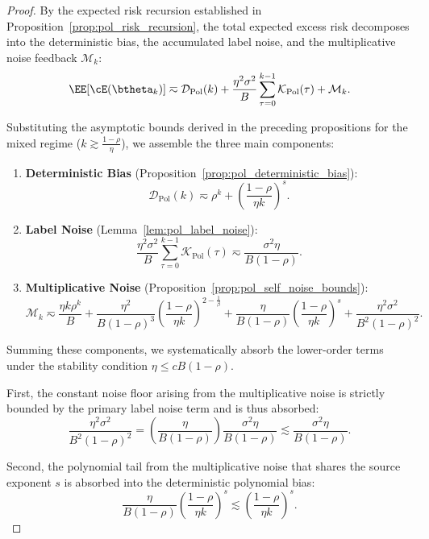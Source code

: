 \begin{proof}
By the expected risk recursion established in Proposition~\ref{prop:pol_risk_recursion}, the total expected excess risk decomposes into the deterministic bias, the accumulated label noise, and the multiplicative noise feedback $\mathcal{M}_k$:
\[
    \EE[\cE(\btheta_k)]
    \eqsim
    \mathcal{D}_{\mathrm{Pol}}(k)
    +
    \frac{\eta^2\sigma^2}{B}\sum_{\tau=0}^{k-1}\mathcal{K}_{\mathrm{Pol}}(\tau)
    +
    \mathcal M_k.
\]

Substituting the asymptotic bounds derived in the preceding propositions for the mixed regime ($k \gtrsim \frac{1-\rho}{\eta}$), we assemble the three main components:
\begin{enumerate}
    \item \textbf{Deterministic Bias} (Proposition~\ref{prop:pol_deterministic_bias}):
    \[
        \mathcal{D}_{\mathrm{Pol}}(k) \eqsim \rho^k + \left(\frac{1-\rho}{\eta k}\right)^s.
    \]
    \item \textbf{Label Noise} (Lemma~\ref{lem:pol_label_noise}):
    \[
        \frac{\eta^2\sigma^2}{B}\sum_{\tau=0}^{k-1}\mathcal{K}_{\mathrm{Pol}}(\tau) \eqsim \frac{\sigma^2\eta}{B(1-\rho)}.
    \]
    \item \textbf{Multiplicative Noise} (Proposition~\ref{prop:pol_self_noise_bounds}):
    \[
        \mathcal M_k \eqsim \frac{\eta k\rho^k}{B} + \frac{\eta^2}{B(1-\rho)^3} \left(\frac{1-\rho}{\eta k}\right)^{2-\frac{1}{\beta}} + \frac{\eta}{B(1-\rho)} \left(\frac{1-\rho}{\eta k}\right)^s + \frac{\eta^2\sigma^2}{B^2(1-\rho)^2}.
    \]
\end{enumerate}

Summing these components, we systematically absorb the lower-order terms under the stability condition $\eta \le cB(1-\rho)$. 

First, the constant noise floor arising from the multiplicative noise is strictly bounded by the primary label noise term and is thus absorbed:
\[
    \frac{\eta^2\sigma^2}{B^2(1-\rho)^2} = \left(\frac{\eta}{B(1-\rho)}\right) \frac{\sigma^2\eta}{B(1-\rho)} \lesssim \frac{\sigma^2\eta}{B(1-\rho)}.
\]

Second, the polynomial tail from the multiplicative noise that shares the source exponent $s$ is absorbed into the deterministic polynomial bias:
\[
    \frac{\eta}{B(1-\rho)} \left(\frac{1-\rho}{\eta k}\right)^s \lesssim \left(\frac{1-\rho}{\eta k}\right)^s.
\]


\end{proof}
